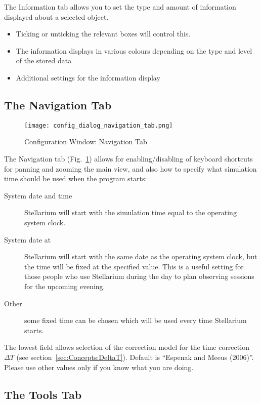 The Information tab allows you to set the type and amount of information
displayed about a selected object.
\begin{itemize}
\item Ticking or unticking the relevant boxes will control this.
\item The information displays in various colours depending on the type and
level of the stored data
\item Additional settings for the information display
\end{itemize}

\subsection{The Navigation Tab}
\label{sec:gui:configuration:nav}


\begin{figure}[p]
\centering\texttt{[image: config\_dialog\_navigation\_tab.png]}
\caption{Configuration Window: Navigation Tab}
\label{fig:gui:configuration:nav}
\end{figure}

The Navigation tab (Fig.~\ref{fig:gui:configuration:nav}) allows for
enabling/disabling of keyboard shortcuts for panning and zooming the
main view, and also how to specify what simulation time should be used
when the program starts:

\begin{description}
\item[System date and time] Stellarium will start with
  the simulation time equal to the operating system clock.
\item[System date at] Stellarium will start with the
  same date as the operating system clock, but the time will be fixed at
  the specified value. This is a useful setting for those people who use
  Stellarium during the day to plan observing sessions for the upcoming
  evening.
\item[Other] some fixed time can be chosen which will
  be used every time Stellarium starts.
\end{description}

\noindent The lowest field allows selection of the correction model for the time
correction $\Delta T$ (see section~\ref{sec:Concepts:DeltaT}). Default
is ``Espenak and Meeus (2006)''. Please use other values only if you
know what you are doing.

\subsection{The Tools Tab}
\label{sec:gui:configuration:tools}



